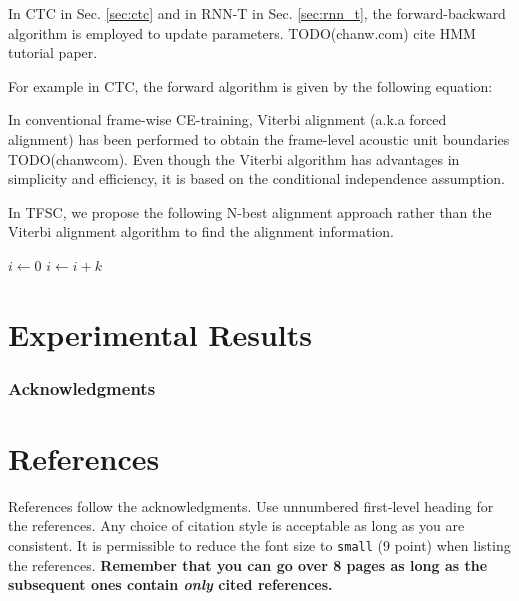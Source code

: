 \documentclass{article}
\begin{document}
In CTC in Sec. \ref{sec:ctc} and in RNN-T in Sec. \ref{sec:rnn_t}, the 
forward-backward algorithm is employed to update parameters. 
TODO(chanw.com) cite HMM tutorial paper.

For example in CTC, the forward algorithm is given by the following equation:



In conventional frame-wise CE-training, Viterbi alignment 
(a.k.a forced alignment) has been performed to obtain the frame-level 
acoustic unit  boundaries TODO(chanwcom). Even though the Viterbi algorithm
has advantages in simplicity and efficiency, it is based on
the conditional independence assumption.

In TFSC, we propose the following N-best alignment approach rather than
the Viterbi alignment algorithm to find the alignment information.

\begin{algorithmic}

	\EndFor
\EndFor

    \State $i\gets 0$
\Else
        \State $i\gets i+k$
    \EndIf
\EndIf
\label{algorithm:n_best_alignment}
\end{algorithmic}





\section{Experimental Results}
\label{sec:experimental_results}


\subsubsection*{Acknowledgments}


\section*{References}

References follow the acknowledgments. Use unnumbered first-level
heading for the references. Any choice of citation style is acceptable
as long as you are consistent. It is permissible to reduce the font
size to \verb+small+ (9 point) when listing the references. {\bf
  Remember that you can go over 8 pages as long as the subsequent ones contain
  \emph{only} cited references.}
\medskip

\small

\clearpage
\newpage


\end{document}
